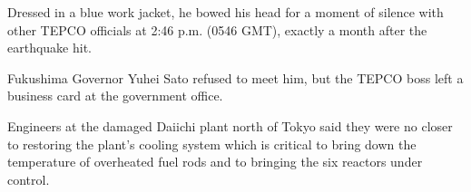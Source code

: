 Dressed in a blue work jacket, he bowed his head for a moment of silence with other TEPCO officials at 2:46 p.m. (0546 GMT), exactly a month after the earthquake hit.

Fukushima Governor Yuhei Sato refused to meet him, but the TEPCO boss left a business card at the government office.

Engineers at the damaged Daiichi plant north of Tokyo said they were no closer to restoring the plant's cooling system which is critical to bring down the temperature of overheated fuel rods and to bringing the six reactors under control.
